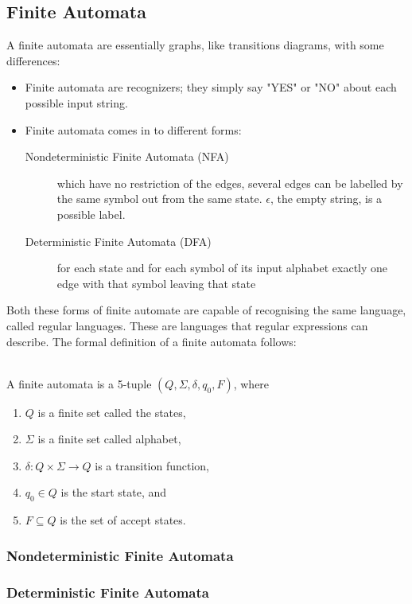 \subsection{Finite Automata}
A finite automata are essentially graphs, like transitions diagrams, with some 
differences:
\begin{itemize}
  \item Finite automata are recognizers; they simply say "YES" or "NO" about 
each possible input string.
  \item Finite automata comes in to different forms:
    \begin{description}
      \item [Nondeterministic Finite Automata (NFA)] which have no restriction 
of the edges, several edges can be labelled by the same symbol out from the 
same state. $\epsilon$, the empty string, is a possible label. 
      \item [Deterministic Finite Automata (DFA)] for each state and for each 
symbol of its input alphabet exactly one edge with that symbol leaving that 
state
    \end{description}
\end{itemize}
Both these forms of finite automate are capable of recognising the same 
language, called regular languages. These are languages that regular 
expressions can describe. \cite{Aho2006}
The formal definition of a finite automata follows:
\begin{definition} \label{finiteAutomataDef} 
\cite{sipser2006} \\
A finite automata is a 5-tuple $(Q, \Sigma, \delta, q_0, F)$, where
\begin{enumerate}
  \item $Q$ is a finite set called the states,
  \item $\Sigma$ is a finite set called alphabet,
  \item $\delta: Q \times \Sigma \to Q$ is a transition function,
  \item $q_0 \in Q$ is the start state, and
  \item $F \subseteq Q$ is the set of accept states.
\end{enumerate}

\end{definition}
\subsubsection{Nondeterministic Finite Automata}
\subsubsection{Deterministic Finite Automata}

 
